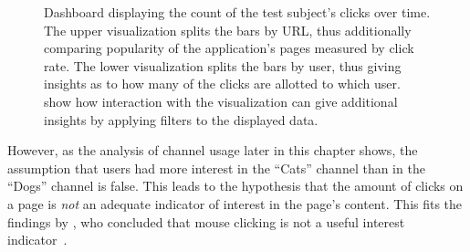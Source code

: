 \begin{figure}[t]
        \caption[Dashboard displaying the count of the test subject's clicks over time.]{
        Dashboard displaying the count of the test subject's clicks over time.
        The upper visualization splits the bars by URL, thus additionally comparing popularity of the application's pages measured by click rate.
        The lower visualization splits the bars by user, thus giving insights as to how many of the clicks are allotted to which user.
         show how interaction with the visualization can give additional insights by applying filters to the displayed data.
        }
        \label{figure:evaluation:user:dashboard-clicks}
\end{figure}

However, as the analysis of channel usage later in this chapter shows, the assumption that users had more interest in the ``Cats'' channel than in the ``Dogs'' channel is false.
This leads to the hypothesis that the amount of clicks on a page is \emph{not} an adequate indicator of interest in the page's content.
This fits the findings by \citeauthor{Claypool2001}, who concluded that mouse clicking is not a useful interest indicator~\cite{Claypool2001}.

